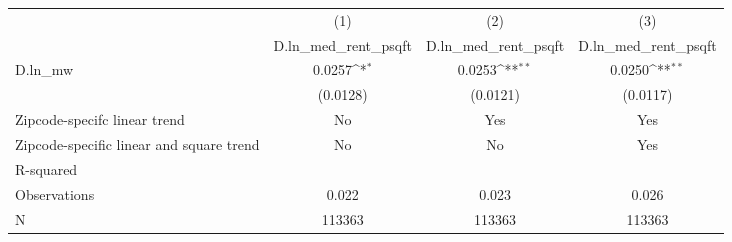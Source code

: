 {
\def\sym#1{\ifmmode^{#1}\else\(^{#1}\)\fi}
\begin{tabular}{l*{3}{c}}
\hline\hline
          &\multicolumn{1}{c}{(1)}&\multicolumn{1}{c}{(2)}&\multicolumn{1}{c}{(3)}\\
          &\multicolumn{1}{c}{D.ln\_med\_rent\_psqft}&\multicolumn{1}{c}{D.ln\_med\_rent\_psqft}&\multicolumn{1}{c}{D.ln\_med\_rent\_psqft}\\
\hline
D.ln\_mw   &   0.0257\sym{*}  &   0.0253\sym{**} &   0.0250\sym{**} \\
          & (0.0128)         & (0.0121)         & (0.0117)         \\
\hline
Zipcode-specifc linear trend&       No         &      Yes         &      Yes         \\
Zipcode-specific linear and square trend&       No         &       No         &      Yes         \\
R-squared &                  &                  &                  \\
Observations&    0.022         &    0.023         &    0.026         \\
N         &   113363         &   113363         &   113363         \\
\hline\hline
\end{tabular}
}
